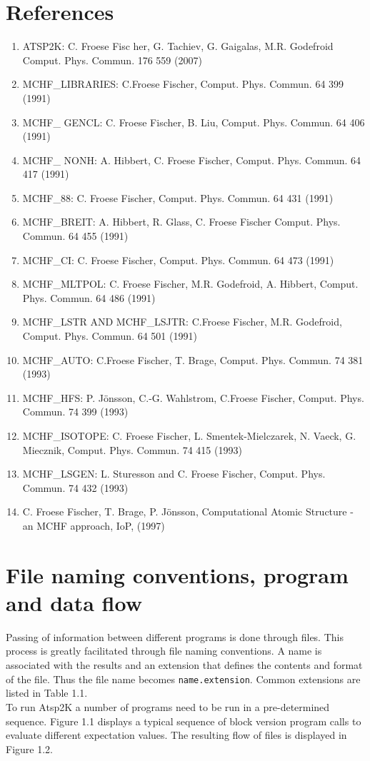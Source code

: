 \documentclass[fleqn,10pt]{book}
\begin{document}
\section*{References}
\begin{enumerate} 
\item ATSP2K:  C. Froese Fisc
her, G. Tachiev, G. Gaigalas, M.R. Godefroid
Comput. Phys. Commun.
  176 559 (2007)
\item MCHF\_LIBRARIES: C.Froese Fischer, 	Comput. Phys. Commun.
 64 399 (1991)
\item MCHF\_ GENCL: C. Froese Fischer, B. Liu, Comput. Phys. Commun.
 64 406 (1991)
\item MCHF\_ NONH: A. Hibbert, C. Froese Fischer, 	    Comput. Phys. Commun.
 64 417 (1991)
\item MCHF\_88: C. Froese Fischer,  	Comput. Phys. Commun.
 64 431 (1991)
\item MCHF\_BREIT: A. Hibbert, R. Glass, C. Froese Fischer 	Comput. Phys. Commun.
 64 455 (1991)
\item MCHF\_CI: C. Froese Fischer, 	Comput. Phys. Commun.
 64 473 (1991)
\item MCHF\_MLTPOL: C. Froese Fischer, M.R. Godefroid, A. Hibbert, 	Comput. Phys. Commun.
 64 486 (1991)
\item MCHF\_LSTR AND MCHF\_LSJTR: C.Froese Fischer, M.R. Godefroid, 	Comput. Phys. Commun.
 64 501 (1991)
\item MCHF\_AUTO: C.Froese Fischer, T. Brage, 	Comput. Phys. Commun.
 74 381  (1993)
\item MCHF\_HFS: P. J\"onsson, C.-G. Wahlstrom, C.Froese Fischer, 	Comput. Phys. Commun.
 74 399 (1993)
\item MCHF\_ISOTOPE: C. Froese Fischer, L. Smentek-Mielczarek, N. Vaeck, G. Miecznik, 	Comput. Phys. Commun.
 74 415 (1993)
\item MCHF\_LSGEN: L. Sturesson and C. Froese Fischer, Comput. Phys. Commun. 74 432 (1993)
\item C. Froese Fischer, T. Brage, P. J\"onsson, Computational Atomic Structure - an MCHF approach, IoP, (1997)
\end{enumerate}

\clearpage

\section{File naming conventions, program and data flow}
Passing of information between different programs is done through files. This process is greatly facilitated through file
naming conventions.  A name is associated with the results and an extension that defines the contents and format
of the file. Thus the file name becomes \verb+name.extension+. Common extensions are listed in Table 1.1.\medskip\\
To run
{\sc Atsp}2K a number of programs need to be run in a pre-determined sequence. Figure 1.1
displays a typical sequence of block version program calls to evaluate different expectation values.
The resulting flow of files is displayed in Figure 1.2. 
\end{document}
